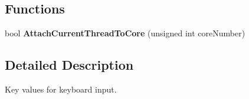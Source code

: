 \subsection*{Functions}
\begin{DoxyCompactItemize}
\item 
\mbox{\label{namespace_blade_af513a3e743818ae50beb39b9bd577eba}} 
bool {\bfseries Attach\+Current\+Thread\+To\+Core} (unsigned int core\+Number)
\end{DoxyCompactItemize}


\subsection{Detailed Description}
Key values for keyboard input. 
